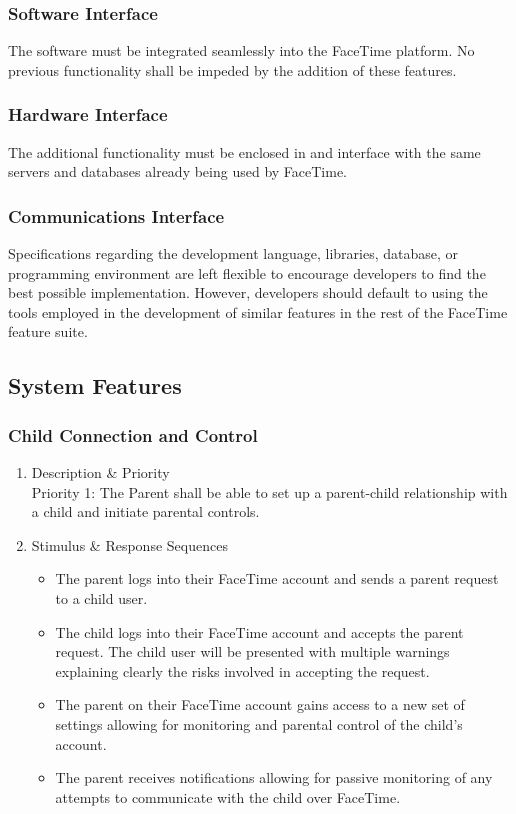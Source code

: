 \documentclass[12pt]{article}
\begin{document}
\subsubsection{Software Interface}

The software must be integrated seamlessly into the FaceTime  platform. No previous functionality shall be impeded
by the addition of these features.

\subsubsection{Hardware Interface}

The additional functionality must be enclosed in and interface with the same servers and databases already being
used by FaceTime.

\subsubsection{Communications Interface}

Specifications regarding the development language, libraries, database, or programming environment are left
flexible to encourage developers to find the best possible implementation. However, developers should default to using
the tools employed in the development of similar features in the rest of the FaceTime feature suite.

\subsection{System Features}

\subsubsection{Child Connection and Control}

\begin{enumerate}
    \item Description \& Priority\\
    Priority 1: The Parent shall be able to set up a parent-child relationship with a child and initiate parental controls.
    \item Stimulus \& Response Sequences
    \begin{itemize}
        \item The parent logs into their FaceTime account and sends a parent request to a child user.
        \item The child logs into their FaceTime account and accepts the parent request. The child user will be
        presented with multiple warnings explaining clearly the risks involved in accepting the request.
        \item The parent on their FaceTime account gains access to a new set of settings allowing for monitoring
        and parental control of the child's account.
        \item The parent receives notifications allowing for passive monitoring of any attempts to communicate with
        the child over FaceTime.
    \end{itemize}
\end{enumerate}
\end{document}
